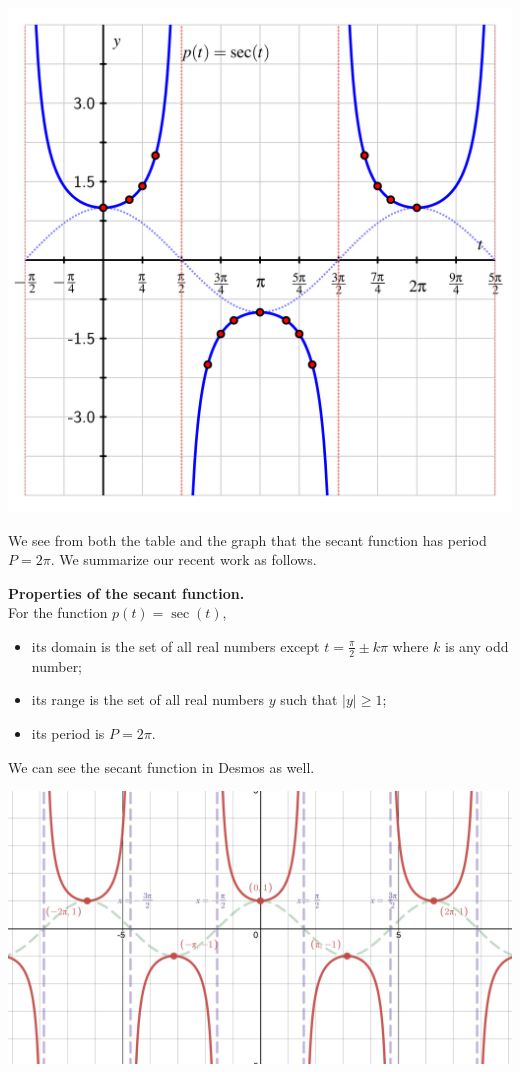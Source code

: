 \documentclass[nooutcomes, noauthor]{ximera}
\begin{document}
\begin{image}
\includegraphics{other-sec-definition-graph.png}
\end{image}

We see from both the table and the graph that the secant function has period \(P = 2\pi\).  We summarize our recent work as follows.

\begin{callout}
\textbf{Properties of the secant function.}\\
For the function \(p(t) = \sec(t)\),
\begin{itemize}[label=\textbullet]
\item
its domain is the set of all real numbers except \(t = \frac{\pi}{2} \pm k\pi\) where \(k\) is any odd number;%
\item
its range is the set of all real numbers \(y\) such that \(|y| \ge 1\);%
\item
its period is \(P = 2\pi\).%
\end{itemize}
\end{callout}

We can see the secant function in Desmos as well.  

\begin{image}
\includegraphics[width=\textwidth]{secant.jpg}
\end{image}
\end{document}
